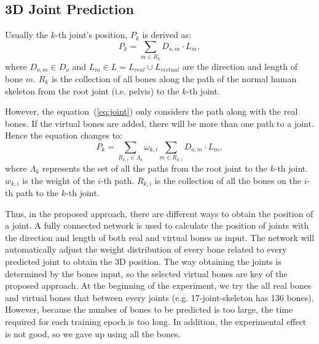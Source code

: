 \documentclass[journal]{IEEEtran}
\begin{document}
\subsection{3D Joint Prediction}
\label{subsection:3.2}
Usually the $k$-th joint's position, $P_k$ is derived as:
\begin{equation}
	P_k = \sum_{m\in R_k}D_{o,m}\cdot L_{m},
	\label{eq:joint}
\end{equation}
where $D_{o,m}\in D_o$ and $L_m\in L=L_{real}\cup L_{virtual}$ are the direction and length of bone $m$. $R_k$ is the collection of all bones along the path of the normal human skeleton from the root joint (i.e. pelvis) to the $k$-th joint.

However, the equation~(\ref{eq:joint}) only considers the path along with the real bones. If the virtual bones are added, there will be more than one path to a joint. Hence the equation changes to:
\begin{equation}
	P_k = \sum_{R_{k, i}\in \Lambda_k }\omega_{k,i}\sum_{m\in R_{k,i}}D_{o,m}\cdot L_{m},
\end{equation}
where $\Lambda_k$ represents the set of all the paths from the root joint to the $k$-th joint. $w_{k,i}$ is the weight of the $i$-th path. $R_{k,i}$ is the collection of all the bones on the $i$-th path to the $k$-th joint.

Thus, in the proposed approach, there are different ways to obtain the position of a joint. A fully connected network is used to calculate the position of joints with the direction and length of both real and virtual bones as input. The network will automatically adjust the weight distribution of every bone related to every predicted joint to obtain the 3D position. The way obtaining the joints is determined by the bones input, so the selected virtual bones are key of the proposed approach. At the beginning of the experiment, we try the all real bones and virtual bones that between every joints (e.g. 17-joint-skeleton has 136 bones). However, because the number of bones to be predicted is too large, the time required for each training epoch is too long. In addition, the experimental effect is not good, so we gave up using all the bones.
\end{document}
